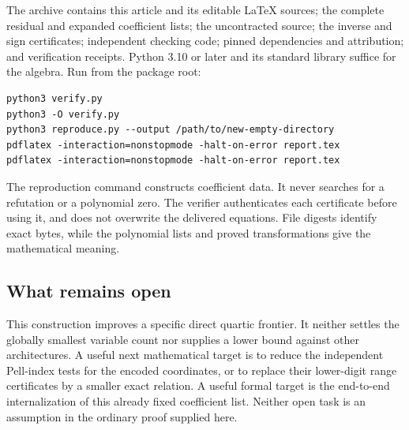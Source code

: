 \documentclass[10pt,letterpaper]{article}
\theoremstyle{definition}\newtheorem{definition}[theorem]{Definition}
\theoremstyle{remark}\newtheorem{remark}[theorem]{Remark}
\begin{document}
The archive contains this article and its editable LaTeX sources; the
complete residual and expanded coefficient lists; the uncontracted source;
the inverse and sign certificates; independent checking code; pinned
dependencies and attribution; and verification receipts.
Python 3.10 or later and its standard library suffice for the algebra.
Run from the package root:
\begin{verbatim}
python3 verify.py
python3 -O verify.py
python3 reproduce.py --output /path/to/new-empty-directory
pdflatex -interaction=nonstopmode -halt-on-error report.tex
pdflatex -interaction=nonstopmode -halt-on-error report.tex
\end{verbatim}
The reproduction command constructs coefficient data. It never searches
for a refutation or a polynomial zero. The verifier authenticates each
certificate before using it, and does not overwrite the delivered
equations. File digests identify exact bytes, while the polynomial lists
and proved transformations give the mathematical meaning.

\subsection{What remains open}

This construction improves a specific direct quartic frontier. It neither
settles the globally smallest variable count nor supplies a lower bound
against other architectures. A useful next mathematical target is to
reduce the independent Pell-index tests for the encoded coordinates, or
to replace their lower-digit range certificates by a smaller exact
relation. A useful formal target is the end-to-end internalization of this
already fixed coefficient list. Neither open task is an assumption in
the ordinary proof supplied here.
\end{document}

